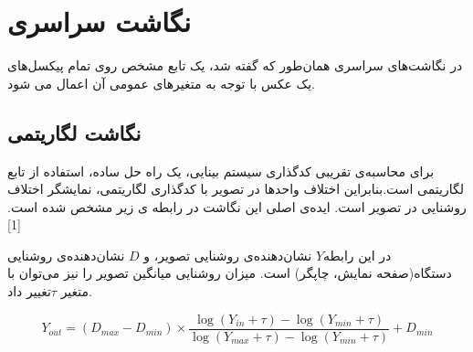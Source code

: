 

\section{نگاشت سراسری}

در نگاشت‌های سراسری همان‌طور که گفته شد، یک تابع مشخص روی تمام پیکسل‌های یک عکس با توجه به متغیرهای عمومی آن اعمال می شود.

\subsection{نگاشت لگاریتمی}
برای محاسبه‌ی تقریبی کدگذاری سیستم بینایی، یک راه حل ساده، استفاده از تابع لگاریتمی است.بنابراین اختلاف واحدها در تصویر با کدگذاری لگاریتمی، نمایشگر اختلاف روشنایی در تصویر است. ایده‌ی اصلی این نگاشت در رابطه ی زیر مشخص شده است. [1] 

در این رابطه$Y$  نشان‌دهنده‌ی روشنایی تصویر، و $D$  نشان‌دهنده‌ی روشنایی دستگاه(صفحه نمایش، چاپگر) است.
میزان روشنایی میانگین تصویر را نیز می‌توان با متغیر $\tau $تغییر داد.

\begin{equation}
Y_{out}  = (D_{max} - D_{min}) \times
 \frac{\log( Y_{in} + \tau) - \log(Y_{min} + \tau)}{\log( Y_{max} + \tau) - \log(Y_{min} + \tau)} 
+ D_{min}
\end{equation}

